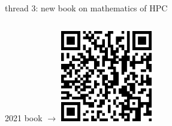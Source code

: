 \documentclass[svgnames,
               hyperref={colorlinks,citecolor=DeepPink4,linkcolor=FireBrick,urlcolor=Maroon},
               usepdftitle=false]  %
               {beamer}
\begin{document}
\begin{frame}{thread 3: new book on mathematics of HPC}
\begin{columns}
\begin{column}{0.4\textwidth}
\vspace{10mm}
\hfill {\tiny 2021 book $\to$} \quad \href{https://epubs.siam.org/doi/book/10.1137/1.9781611976311}{\includegraphics[width=0.3\textwidth]{figs/QRbook.png}}
\end{column}
\end{columns}
\end{frame}
\end{document}
